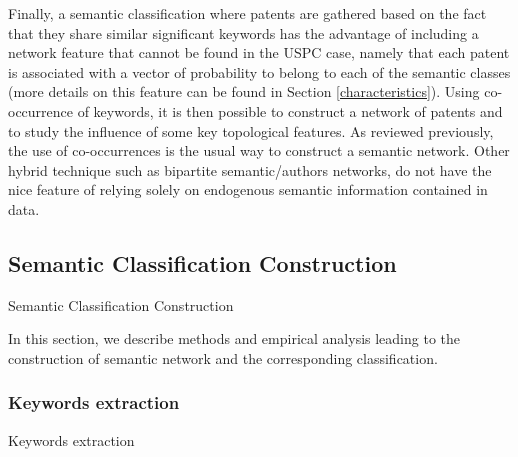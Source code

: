 Finally, a semantic classification where patents are gathered based on the fact that they share similar significant keywords has the advantage of including a network feature that cannot be found in the USPC case, namely that each patent is associated with a vector of probability to belong to each of the semantic classes (more details on this feature can be found in Section \ref{characteristics}). Using co-occurrence of keywords, it is then possible to construct a network of patents and to study the influence of some key topological features. As reviewed previously, the use of co-occurrences is the usual way to construct a semantic network. Other hybrid technique such as bipartite semantic/authors networks, do not have the nice feature of relying solely on endogenous semantic information contained in data.

\subsection*{Semantic Classification Construction \label{keywords}}{Semantic Classification Construction}

In this section, we describe methods and empirical analysis leading to the construction of semantic network and the corresponding classification. 

\subsubsection*{Keywords extraction}{Keywords extraction}
\label{keywordsextraction}

